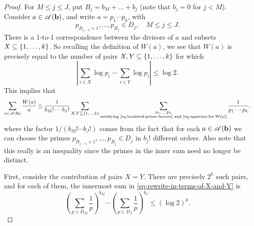 \begin{proof}
    For $M\le j \le J$, put $B_j = b_M + \dots + b_j$ (note that $b_j = 0$ for $j < M$).
    Consider $a \in \mathscr{A} (\mathbf{b})$, and write $a = p_1 \cdots p_k$, with
    \begin{equation} \label{eq:localised-prime-factors}
        p_{B_{j - 1} + 1}, \dots, p_{B_j} \in D_j, \quad M \le j \le J.
    \end{equation}
    There is a 1-to-1 correspondence between the divisors of $a$ and subsets $X \subseteq \left\{1, \dots, k\right\}$. 
    So recalling the definition of $W(a)$, we see that $W(a)$ is precisely equal to the number of pairs $X, Y \subseteq \left\{1, \dots, k\right\}$ for which 
    \begin{equation} \label{eq:equation-for-W(a)}
        \left| \sum \limits_{i \in X} \log p_i - \sum \limits_{i \in Y} \log p_i \right| \le \log 2.
    \end{equation}
    This implies that 
    \begin{equation} \label{eq:rewrite-in-terms-of-X-and-Y}
        \sum \limits_{a \in \mathscr{A}(\mathbf{b})} \frac{W(a)}{a} \le \frac{1}{b_M ! \cdots b_J!} \sum \limits_{X, Y \subseteq \left\{1, \dots, k\right\}} \sum \limits_{\substack{p_1, \dots, p_k\\ \text{satisfying \eqref{eq:localised-prime-factors} and \eqref{eq:equation-for-W(a)}}  }} \frac{1}{p_1 \cdots p_k},
    \end{equation}
    where the factor $1/(b_M ! \cdots b_J!)$ comes from the fact that for each $a \in \mathscr{A}(\mathbf{b})$ we can choose the primes $p_{B_{j - 1} + 1}, \dots, p_{B_j} \in D_j$ in $b_j!$ different orders. Also note that this really is an inequality since the primes in the inner sum need no longer be distinct.

    First, consider the contribution of pairs $X = Y$. There are precisely $2^k$ such pairs, and for each of them, the innermost sum in \eqref{eq:rewrite-in-terms-of-X-and-Y} is
    \begin{equation*}
        \left( \sum \limits_{p \in D_M} \frac{1}{p} \right)^{b_M} \cdots \left( \sum \limits_{p \in D_J} \frac{1}{p} \right)^{b_J} \le (\log 2) ^k.
    \end{equation*}


\end{proof}
